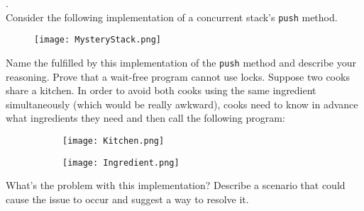 \documentclass[main]{subfiles}
\begin{document}
\begin{ExerciseList}
        
        \Exercise[title={Progress Conditions},label=PC].\quad \\
            \Question Consider the following implementation of a concurrent stack's \texttt{push} method.
                \begin{figure}[H]
                    \centering
                    \texttt{[image: MysteryStack.png]}
                \end{figure}
                Name the  fulfilled by this implementation of the \texttt{push} method and describe your reasoning.
            \Question Prove that a wait-free program cannot use locks.
            \Question Suppose two cooks share a kitchen. In order to avoid both cooks using the same ingredient simultaneously (which would be really awkward), cooks need to know in advance what ingredients they need and then call the following program:
            \begin{figure}[H]
                \centering
                \begin{subfigure}{.5\textwidth}
                    \centering
                    \texttt{[image: Kitchen.png]}
                \end{subfigure}%
                \begin{subfigure}{.5\textwidth}
                    \centering
                    \texttt{[image: Ingredient.png]}
                \end{subfigure}
            \end{figure}
            What's the problem with this implementation? Describe a scenario that could cause the issue to occur and suggest a way to resolve it.
            

\end{ExerciseList}
\end{document}
